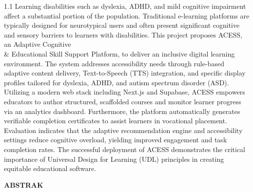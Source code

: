 \documentclass[12pt,a4paper]{report}
\begin{document}
\vspace{1cm}
\begin{spacing}{1.1}
Learning disabilities such as dyslexia, ADHD, and mild cognitive impairment affect a substantial portion of the population. Traditional e-learning platforms are typically designed for neurotypical users and often present significant cognitive and sensory barriers to learners with disabilities. This project proposes ACESS, an Adaptive Cognitive \\\& Educational Skill Support Platform, to deliver an inclusive digital learning environment. The system addresses accessibility needs through rule-based adaptive content delivery, Text-to-Speech (TTS) integration, and specific display profiles tailored for dyslexia, ADHD, and autism spectrum disorder (ASD). Utilizing a modern web stack including Next.js and Supabase, ACESS empowers educators to author structured, scaffolded courses and monitor learner progress via an analytics dashboard. Furthermore, the platform automatically generates verifiable completion certificates to assist learners in vocational placement. Evaluation indicates that the adaptive recommendation engine and accessibility settings reduce cognitive overload, yielding improved engagement and task completion rates. The successful deployment of ACESS demonstrates the critical importance of Universal Design for Learning (UDL) principles in creating equitable educational software.
\end{spacing}

\vfill \null
\newpage

\begin{center}
\vfill \null
{}
{}
\textbf{ABSTRAK}
\end{center}
\end{document}
